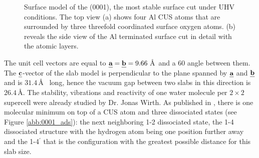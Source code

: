 \documentclass[11pt,DIV=13,BCOR=5mm,a4paper,headinclude]{scrbook}
\def\mathbi#1{\textbf{\em #1}}
\renewcommand{\vec}[1]{\mathbi{#1}}
\begin{document}
\begin{figure}[!ht]
 \centering
{}
 \quad\quad
 \caption{Surface model of the (0001), the most stable surface cut under UHV conditions.
The top view (a) shows four Al CUS atoms that are surrounded by three threefold coordinated surface oxygen atoms.
(b) reveals the side view of the Al terminated surface cut in detail with the atomic layers.}
        \label{abb:surf_0001}
\end{figure}
The unit cell vectors are equal to $\vec{a}=\vec{b}=9.66\,$\AA  ~and a $60$\textdegree{} angle between them.
The $\vec{c}$-vector of the slab model is perpendicular to the plane spanned by $\vec{a}$ and $\vec{b}$ and is $31.4\,$\AA~ long, hence the vacuum gap between two slabs in this direction is $26.4\,$\AA.
The stability, vibrations and reactivity of one water  molecule per $2\times 2$ supercell were already studied by Dr. Jonas Wirth.
As published in \cite{WirthJPCC2012}, there is one molecular minimum on top of a CUS atom and three dissociated states (see Figure \ref{abb:0001_ads}): the next neighboring 1-2 dissociated state, the 1-4 dissociated structure with the hydrogen atom being one position further away and the 1-4$^\prime$ that is the configuration with the greatest possible distance for this slab size.
\end{document}
